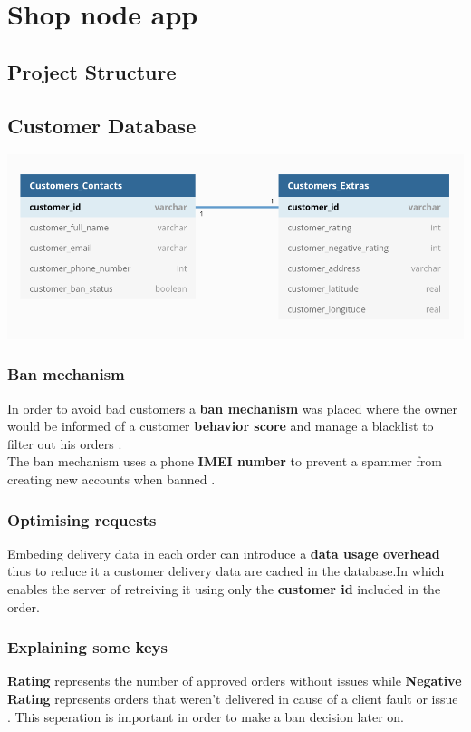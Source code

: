 \documentclass{article}
\begin{document}
\section{Shop node app}
\subsection{Project Structure}
\subsection{Customer Database}
\includegraphics[scale=0.3]{./out/NodeApp/Database/CustomersTable.png}\newline
\subsubsection{Ban mechanism}
In order to avoid bad customers a \textbf{ban mechanism} was placed where the owner would be informed of a customer \textbf{behavior score} and manage a blacklist to filter out his orders .\\
The ban mechanism uses a phone \textbf{IMEI number} to prevent a spammer from creating new accounts when banned .
\subsubsection{Optimising requests}
Embeding delivery data in each order can introduce a \textbf{data usage overhead} thus to reduce it a customer delivery data are cached in the database.In which enables the server of retreiving it using only the \textbf{customer id} included in the order. 
\subsubsection{Explaining some keys}
\textbf{Rating} represents the number of approved orders without issues while \textbf{Negative Rating} represents orders that weren't delivered in cause of a client fault or issue . This seperation is important in order to make a ban decision later on.
\end{document}
